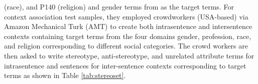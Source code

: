 (race), and P140 (religion) and gender terms from \cite{nosek2002math} as the target terms. For context association test samples, they employed crowdworkers (USA-based) via Amazon Mechanical Turk (AMT) to create both intrasentence and intersentence contexts containing target terms from the four domains gender, profession, race, and religion corresponding to different social categories. The crowd workers are then asked to write stereotype, anti-stereotype, and unrelated attribute terms for intrasentence and sentences for inter-sentence contexts corresponding to target terms as shown in Table \ref{tab:stereoset}.  
\begin{table}[t!]
\caption{StereoSet, Intersentence and intrasentence samples }
\label{tab:stereoset}
\end{table}

